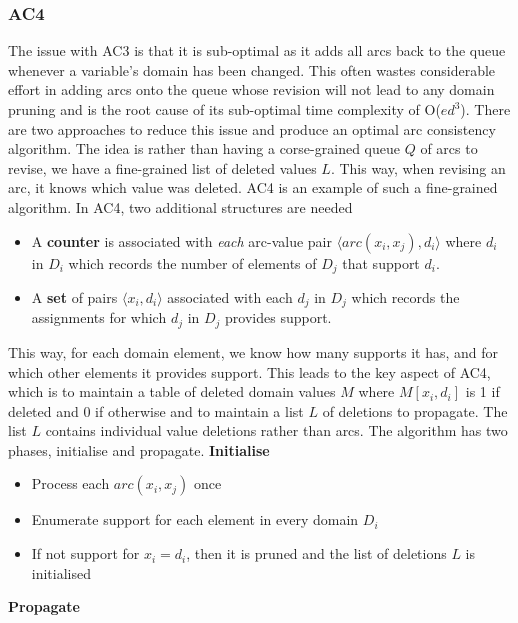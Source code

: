 \documentclass[CS4402-Notes.tex]{subfiles}
\begin{document}
\subsubsection{AC4}
The issue with AC3 is that it is sub-optimal as it adds all arcs back to the queue whenever a variable's domain has been changed. This often wastes considerable effort in adding arcs onto the queue whose revision will not lead to any domain pruning and is the root cause of its sub-optimal time complexity of O($ed^3$). There are two approaches to reduce this issue and produce an optimal arc consistency algorithm.
\n
The idea is rather than having a corse-grained queue $Q$ of arcs to revise, we have a fine-grained list of deleted values $L$. This way, when revising an arc, it knows which value was deleted. AC4 is an example of such a fine-grained algorithm.
\n
In AC4, two additional structures are needed
\begin{itemize}
\item A \textbf{counter} is associated with \textit{each} arc-value pair $\langle arc(x_i,x_j), d_i \rangle$ where $d_i$ in $D_i$ which records the number of elements of $D_j$ that support $d_i$.
\item A \textbf{set} of pairs $\langle x_i, d_i \rangle$ associated with each $d_j$ in $D_j$ which records the assignments for which $d_j$ in $D_j$ provides support.
\end{itemize}
This way, for each domain element, we know how many supports it has, and for which other elements it provides support. This leads to the key aspect of AC4, which is to maintain a table of deleted domain values $M$ where $M[x_i, d_i]$ is 1 if deleted and 0 if otherwise and to maintain a list $L$ of deletions to propagate. The list $L$ contains individual value deletions rather than arcs.
\n
The algorithm has two phases, initialise and propagate.
\n
\textbf{Initialise} \\
\vspace{-0.5\baselineskip}
\begin{itemize}
\item Process each $arc(x_i, x_j)$ once
\item Enumerate support for each element in every domain $D_i$
\item If not support for $x_i = d_i$, then it is pruned and the list of deletions $L$ is initialised
\end{itemize}
\vspace{\baselineskip}
\textbf{Propagate} \\
\vspace{-0.5\baselineskip}
\end{document}
